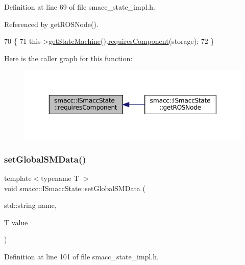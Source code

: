 Definition at line 69 of file smacc\+\_\+state\+\_\+impl.\+h.



Referenced by get\+R\+O\+S\+Node().


\begin{DoxyCode}
70 \{
71     this->\hyperlink{classsmacc_1_1ISmaccState_a562bb3f9a3ac16b8be71e4794c9e7523}{getStateMachine}().\hyperlink{classsmacc_1_1ISmaccStateMachine_aa6b25e28f3bce24c4b356dc865a9eb7b}{requiresComponent}(storage);
72 \}
\end{DoxyCode}
Here is the caller graph for this function\+:
\nopagebreak
\begin{figure}[H]
\begin{center}
\leavevmode
\includegraphics[width=350pt]{classsmacc_1_1ISmaccState_afd5264c36403d22e124eea89a0122e59_icgraph}
\end{center}
\end{figure}
\mbox{\label{classsmacc_1_1ISmaccState_a120fcda41b44a437ff2e3906ac9fa5ca}} 
\subsubsection{\texorpdfstring{set\+Global\+S\+M\+Data()}{setGlobalSMData()}}
{\footnotesize\ttfamily template$<$typename T $>$ \\
void smacc\+::\+I\+Smacc\+State\+::set\+Global\+S\+M\+Data (\begin{DoxyParamCaption}\item[{std\+::string}]{name,  }\item[{T}]{value }\end{DoxyParamCaption})}



Definition at line 101 of file smacc\+\_\+state\+\_\+impl.\+h.



